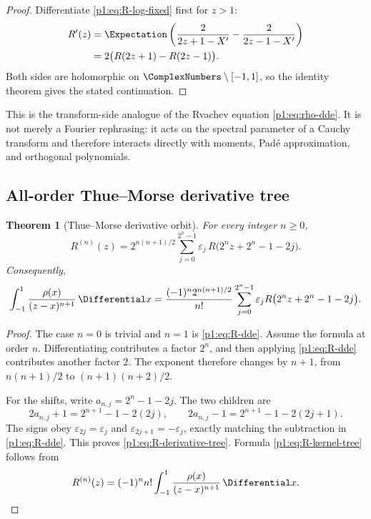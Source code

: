 \documentclass[11pt]{article}
\newtheorem{theorem}{Theorem}[section]
\theoremstyle{definition}
\theoremstyle{remark}
\newcommand{\eps}{\varepsilon}
\begin{document}
\begin{proof}
Differentiate \eqref{p1:eq:R-log-fixed} first for \(z>1\):
\begin{align*}
 R'(z)
 &=\Expectation\left(\frac{2}{2z+1-X'}-\frac{2}{2z-1-X'}\right)\\
 &=2\bigl(R(2z+1)-R(2z-1)\bigr).
\end{align*}
Both sides are holomorphic on \(\ComplexNumbers\setminus[-1,1]\), so the identity theorem gives the
stated continuation.
\end{proof}

This is the transform-side analogue of the Rvachev equation \eqref{p1:eq:rho-dde}.  It is
not merely a Fourier rephrasing: it acts on the spectral parameter of a Cauchy transform and
therefore interacts directly with moments, Pad\'e approximation, and orthogonal polynomials.

\subsection{All-order Thue--Morse derivative tree}

\begin{theorem}[Thue--Morse derivative orbit]\label{p1:thm:R-derivative-tree}
For every integer \(n\ge0\),
\begin{equation}
 \boxed{
 R^{(n)}(z)=2^{n(n+1)/2}
 \sum_{j=0}^{2^n-1}\eps_j\,
 R\bigl(2^n z+2^n-1-2j\bigr).
 }                                                           \label{p1:eq:R-derivative-tree}
\end{equation}
Consequently,
\begin{equation}
 \int_{-1}^{1}\frac{\rho(x)}{(z-x)^{n+1}}\,\Differential x
 =\frac{(-1)^n2^{n(n+1)/2}}{n!}
 \sum_{j=0}^{2^n-1}\eps_j
 R\bigl(2^n z+2^n-1-2j\bigr).                               \label{p1:eq:R-kernel-tree}
\end{equation}
\end{theorem}

\begin{proof}
The case \(n=0\) is trivial and \(n=1\) is \eqref{p1:eq:R-dde}.  Assume the formula at
order \(n\).  Differentiating contributes a factor \(2^n\), and then applying
\eqref{p1:eq:R-dde} contributes another factor \(2\).  The exponent therefore changes by
\(n+1\), from \(n(n+1)/2\) to \((n+1)(n+2)/2\).

For the shifts, write \(a_{n,j}=2^n-1-2j\).  The two children are
\[
 2a_{n,j}+1=2^{n+1}-1-2(2j),
 \qquad
 2a_{n,j}-1=2^{n+1}-1-2(2j+1).
\]
The signs obey \(\eps_{2j}=\eps_j\) and \(\eps_{2j+1}=-\eps_j\), exactly matching the
subtraction in \eqref{p1:eq:R-dde}.  This proves \eqref{p1:eq:R-derivative-tree}.  Formula
\eqref{p1:eq:R-kernel-tree} follows from
\[
 R^{(n)}(z)=(-1)^n n!\int_{-1}^{1}\frac{\rho(x)}{(z-x)^{n+1}}\,\Differential x.
\]
\end{proof}
\end{document}

